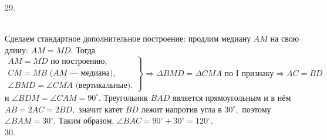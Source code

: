 \documentclass[12pt]{article}
\begin{document}
29. \begin{figure}[ht!]
\end{figure}\\
Сделаем стандартное дополнительное построение: продлим медиану $AM$ на свою длину: $AM=MD.$ Тогда $\left.\begin{array}{l}AM=MD\text{ по построению},\\
 CM=MB\text{ ($AM$ --- медиана)},\\ \angle BMD=\angle CMA\text{ (вертикальные).}\end{array}\right\}\Rightarrow
\Delta BMD=\Delta CMA\text{ по I признаку}\Rightarrow AC=BD$ и $\angle BDM=\angle CAM=90^\circ.$ Треугольник $BAD$ является прямоугольным и в нём $AB=2AC=2BD,$ значит катет $BD$ лежит напротив угла в $30^\circ,$ поэтому $\angle BAM=30^\circ.$ Таким образом, $\angle BAC=90^\circ+30^\circ=120^\circ.$\\
30. \begin{figure}[ht!]
\end{figure}\\
\end{document}
